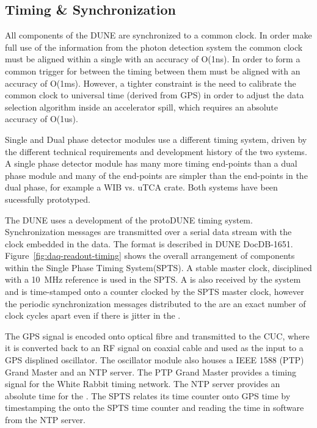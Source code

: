 \subsection{Timing \& Synchronization}
\label{sec:fd-daq-timing}



All components of the DUNE   are
synchronized to a common clock.  In order make full use of the
information from the photon detection system the common clock must be
aligned within a single  with an accuracy of O(1ns).
In order to form a common trigger for  between
 the timing between them must be aligned with an
accuracy of O(1ms).  However, a tighter constraint is the need to
calibrate the common clock to universal time (derived from GPS) in
order to adjust the data selection algorithm inside an accelerator
spill, which requires an absolute accuracy of O(1us).

Single and Dual phase detector modules use a different timing system,
driven by the different technical requirements and development history
of the two systems. A single phase detector module has many more
timing end-points than a dual phase module and many of the end-points
are simpler than the end-points in the dual phase, for example a WIB
vs. uTCA crate. Both systems have been sucessfully prototyped.

The DUNE   uses a development of the protoDUNE
timing system. Synchronization messages are transmitted over a serial
data stream with the clock embedded in the data. The format is
described in DUNE DocDB-1651. Figure~\ref{fig:daq-readout-timing}
shows the overall arrangement of components within the Single Phase
Timing System(SPTS). A stable master clock, disciplined with a \SI{10}{\MHz}
reference is used in the SPTS. A  is
also received by the system and is time-stamped onto a counter clocked
by the SPTS master clock, however the periodic synchronization
messages distributed to the   are an exact number
of clock cycles apart even if there is jitter in the .

The GPS signal is encoded onto optical fibre and transmitted to the
CUC, where it is converted back to an RF signal on coaxial cable and
used as the input to a GPS displined oscillator. The oscillator module
also houses a IEEE 1588 (PTP) Grand Master and an NTP server. The PTP
Grand Master provides a timing signal for the  White Rabbit
timing network. The NTP server provides an absolute time for the
. The SPTS relates its time counter onto GPS time by
timestamping the  onto the SPTS time counter and reading
the time in software from the NTP server.

